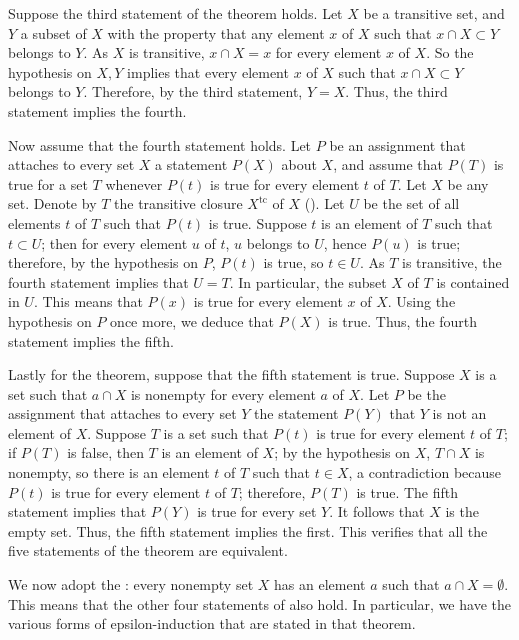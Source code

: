 \documentclass{article}
\begin{document}
Suppose the third statement of the theorem holds.  Let \(X\) be a
transitive set, and \(Y\) a subset of \(X\) with the property that any
element \(x\) of \(X\) such that \(x \cap X \subset Y\) belongs to
\(Y\).  As \(X\) is transitive, \(x \cap X = x\) for every element
\(x\) of \(X\).  So the hypothesis on \(X, Y\) implies that every
element \(x\) of \(X\) such that \(x \cap X \subset Y\) belongs to
\(Y\).  Therefore, by the third statement, \(Y = X\).  Thus, the third
statement implies the fourth.

Now assume that the fourth statement holds.  Let \(P\) be an
assignment that attaches to every set \(X\) a statement \(P(X)\) about
\(X\), and assume that \(P(T)\) is true for a set \(T\) whenever
\(P(t)\) is true for every element \(t\) of \(T\).  Let \(X\) be any
set.  Denote by \(T\) the transitive closure \(X^{\mathrm{tc}}\) of
\(X\) ().  Let \(U\) be the set of all elements
\(t\) of \(T\) such that \(P(t)\) is true.  Suppose \(t\) is an
element of \(T\) such that \(t \subset U\); then for every element
\(u\) of \(t\), \(u\) belongs to \(U\), hence \(P(u)\) is true;
therefore, by the hypothesis on \(P\), \(P(t)\) is true, so
\(t \in U\).  As \(T\) is transitive, the fourth statement implies
that \(U = T\).  In particular, the subset \(X\) of \(T\) is contained
in \(U\).  This means that \(P(x)\) is true for every element \(x\) of
\(X\).  Using the hypothesis on \(P\) once more, we deduce that
\(P(X)\) is true.  Thus, the fourth statement implies the fifth.

Lastly for the theorem, suppose that the fifth statement is true.
Suppose \(X\) is a set such that \(a \cap X\) is nonempty for every
element \(a\) of \(X\).  Let \(P\) be the assignment that attaches to
every set \(Y\) the statement \(P(Y)\) that \(Y\) is not an element of
\(X\).  Suppose \(T\) is a set such that \(P(t)\) is true for every
element \(t\) of \(T\); if \(P(T)\) is false, then \(T\) is an element
of \(X\); by the hypothesis on \(X\), \(T \cap X\) is nonempty, so
there is an element \(t\) of \(T\) such that \(t \in X\), a
contradiction because \(P(t)\) is true for every element \(t\) of
\(T\); therefore, \(P(T)\) is true.  The fifth statement implies that
\(P(Y)\) is true for every set \(Y\).  It follows that \(X\) is the
empty set.  Thus, the fifth statement implies the first.  This
verifies that all the five statements of the theorem are equivalent.

We now adopt the : every nonempty set
\(X\) has an element \(a\) such that \(a \cap X = \emptyset\).  This
means that the other four statements of  also hold.
In particular, we have the various forms of epsilon-induction that are
stated in that theorem.
\end{document}
